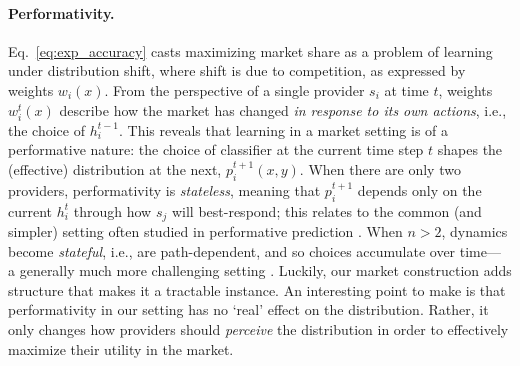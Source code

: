 \paragraph{Performativity.}
Eq.~\eqref{eq:exp_accuracy} casts maximizing market share
as a problem of
learning under distribution shift,
where shift is due to competition, as expressed by weights $w_i(x)$.
From the perspective of a single provider $s_i$ at time $t$,
weights $w_i^t(x)$ describe how the market has changed
\emph{in response to its own actions},
i.e., the choice of $h_i^{t-1}$.
This reveals that learning in a market setting is of a performative nature:
the choice of classifier at the current time step $t$ shapes the (effective) distribution at the next, $p_i^{t+1}(x,y)$.
When there are only two providers, performativity is \emph{stateless},
meaning that $p_i^{t+1}$ depends only on the current $h_i^{t}$
through how $s_j$ will best-respond; this relates to the common (and simpler) setting often studied in performative prediction \citep{perdomo2020performative}.
When $n>2$, dynamics become \emph{stateful}, i.e.,
are path-dependent, and so choices accumulate over time---%
a generally much more challenging setting \citep{brown2022performative,li2022state}.
Luckily, our market construction adds structure that makes it a tractable instance.
An interesting point to make is that performativity in our setting
has no `real' effect on the distribution.
Rather, it only changes how providers should \emph{perceive} the distribution
in order to effectively maximize their utility in the market.







